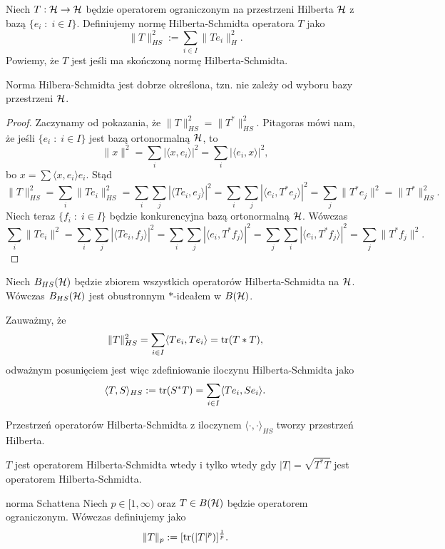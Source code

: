 Niech $T:\operatorname{\mathcal{H}}\to\operatorname{\mathcal{H}}$ będzie operatorem ograniczonym na przestrzeni Hilberta $\operatorname{\mathcal{H}}$ z bazą $\{e_i\;:\;i\in I\}$. Definiujemy normę Hilberta-Schmidta operatora $T$ jako
$$\|T\|_{HS}^2:=\sum_{i\in I}\|Te_i\|_H^2.$$
Powiemy, że $T$ jest  jeśli ma skończoną normę Hilberta-Schmidta.

\begin{fact}{}{}
  Norma Hilbera-Schmidta jest dobrze określona, tzn. nie zależy od wyboru bazy przestrzeni $\operatorname{\mathcal{H}}$.
\end{fact}

\begin{proof}
  Zaczynamy od pokazania, że $\|T\|_{HS}^2=\|T^*\|_{HS}^2$. Pitagoras mówi nam, że jeśli $\{e_i\;:\;i\in I\}$ jest bazą ortonormalną $\operatorname{\mathcal{H}}$, to
  $$\|x\|^2=\sum_i|\langle x, e_i\rangle|^2=\sum_i|\langle e_i, x\rangle|^2,$$
  bo $x=\sum\langle x,e_i\rangle e_i$. Stąd
  $$\|T\|_{HS}^2=\sum_i\|Te_i\|^2_{HS}=\sum_i\sum_j|\langle Te_i, e_j\rangle|^2=\sum_i\sum_j|\langle e_i, T^*e_j\rangle|^2=\sum_j\|T^*e_j\|^2=\|T^*\|_{HS}^2.$$
  Niech teraz $\{f_i\;:\;i\in I\}$ będzie konkurencyjna bazą ortonormalną $\operatorname{\mathcal{H}}$. Wówczas
  $$\sum_i\|Te_i\|^2=\sum_i\sum_j|\langle Te_i, f_j\rangle|^2=\sum_i\sum_j|\langle e_i, T^*f_j\rangle|^2=\sum_j\sum_i|\langle e_i, T^*f_j\rangle|^2=\sum_j\|T^*f_j\|^2.$$
\end{proof}

\begin{remark}{}{}
  Niech $B_{HS}(\operatorname{\mathcal{H}})$ będzie zbiorem wszystkich operatorów Hilberta-Schmidta na $\operatorname{\mathcal{H}}$. Wówczas $B_{HS}(\operatorname{\mathcal{H}})$ jest obustronnym $*$-ideałem w $B(\operatorname{\mathcal{H}})$.
\end{remark}

Zauważmy, że
$$\|T\|_{HS}^2=\sum_{i\in I}\langle Te_i, Te_i\rangle=\operatorname{tr}(T*T),$$
odważnym posunięciem jest więc zdefiniowanie iloczynu Hilberta-Schmidta jako
$$\langle T,S\rangle_{HS}:=\operatorname{tr}(S^*T)=\sum_{i\in I}\langle Te_i, Se_i\rangle.$$

\begin{remark}{}{}
  Przestrzeń operatorów Hilberta-Schmidta z iloczynem $\langle\cdot,\cdot\rangle_{HS}$ tworzy przestrzeń Hilberta.
\end{remark}

\begin{theorem}{}{}
  $T$ jest operatorem Hilberta-Schmidta wtedy i tylko wtedy gdy $|T|=\sqrt{T^*T}$ jest operatorem Hilberta-Schmidta.
\end{theorem}

\begin{definition}{norma Schattena}{}
  Niech $p\in[1,\infty)$ oraz $T\in B(\operatorname{\mathcal{H}})$ będzie operatorem ograniczonym. Wówczas definiujemy  jako
  $$\|T\|_p:=[\operatorname{tr}(|T|^p)]^{\frac{1}{p}}.$$
\end{definition}


